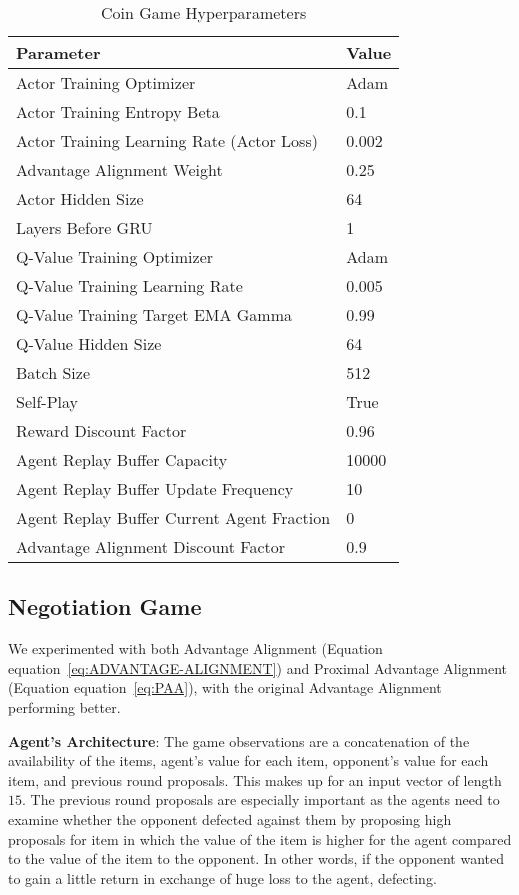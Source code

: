 \documentclass{article} \usepackage{iclr2025_conference,times}
\def\eqref#1{equation~\ref{#1}}
\begin{document}
\begin{table}[h]
\centering
\caption{Coin Game Hyperparameters}
\label{tab:cg_config}
\begin{tabular}{ll}
\textbf{Parameter} & \textbf{Value} \\ \hline

Actor Training Optimizer & Adam \\
Actor Training Entropy Beta & 0.1 \\
Actor Training Learning Rate (Actor Loss) & 0.002 \\
Advantage Alignment Weight & 0.25 \\
Actor Hidden Size & 64 \\
Layers Before GRU & 1 \\
Q-Value Training Optimizer & Adam \\
Q-Value Training Learning Rate & 0.005 \\
Q-Value Training Target EMA Gamma & 0.99 \\
Q-Value Hidden Size & 64 \\
Batch Size & 512 \\
Self-Play & True \\
Reward Discount Factor & 0.96 \\
Agent Replay Buffer Capacity & 10000 \\
Agent Replay Buffer Update Frequency & 10 \\
Agent Replay Buffer Current Agent Fraction & 0 \\
Advantage Alignment Discount Factor & 0.9 \\
\end{tabular}
\end{table}

\subsection{Negotiation Game}
\label{app:NG}

We experimented with both Advantage Alignment (Equation \eqref{eq:ADVANTAGE-ALIGNMENT}) and Proximal Advantage Alignment (Equation \eqref{eq:PAA}), with  the original Advantage Alignment performing better.

\textbf{Agent's Architecture}: 
The game observations are a concatenation of the availability of the items, agent's value for each item, opponent's value for each item, and previous round proposals. This makes up for an input vector of length $15$. The previous round proposals are especially important as the agents need to examine whether the opponent defected against them by proposing high proposals for item in which the value of the item is higher for the agent compared to the value of the item to the opponent. In other words, if the opponent wanted to gain a little return in exchange of huge loss to the agent, defecting.
\end{document}
